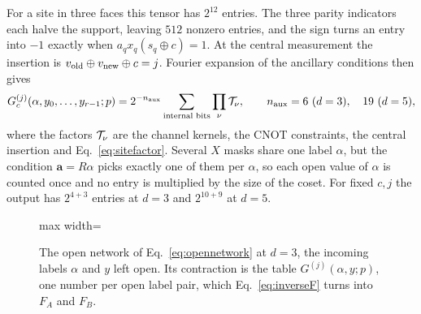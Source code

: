 For a site in three faces this tensor has $2^{12}$ entries. The three parity indicators each halve the support, leaving $512$ nonzero entries, and the sign turns an entry into $-1$ exactly when $a_qx_q(s_q\oplus c)=1$. At the central measurement the insertion is $v_{\rm old}\oplus v_{\rm new}\oplus c=j$. Fourier expansion of the ancillary conditions then gives
\begin{equation}
 G_c^{(j)}(\alpha,y_0,\ldots,y_{r-1};p)=2^{-n_{\rm aux}}\sum_{\text{internal bits}}\prod_\nu{\cal T}_\nu,\qquad
 n_{\rm aux}=6\ (d=3),\quad19\ (d=5),
 \label{eq:opennetwork}
\end{equation}
where the factors ${\cal T}_\nu$ are the channel kernels, the CNOT constraints, the central insertion and Eq.~\eqref{eq:sitefactor}. Several $X$ masks share one label $\alpha$, but the condition $\boldsymbol a=R\alpha$ picks exactly one of them per $\alpha$, so each open value of $\alpha$ is counted once and no entry is multiplied by the size of the coset. For fixed $c,j$ the output has $2^{4+3}$ entries at $d=3$ and $2^{10+9}$ at $d=5$.
\begin{figure}[H]\centering
\begin{adjustbox}{max width=\linewidth}
\end{adjustbox}
\caption{The open network of Eq.~\eqref{eq:opennetwork} at $d=3$, the incoming labels $\alpha$ and $y$ left open. Its contraction is the table $G^{(j)}(\alpha,y;p)$, one number per open label pair, which Eq.~\eqref{eq:inverseF} turns into $F_A$ and $F_B$.}
\label{fig:opennet}
\end{figure}
